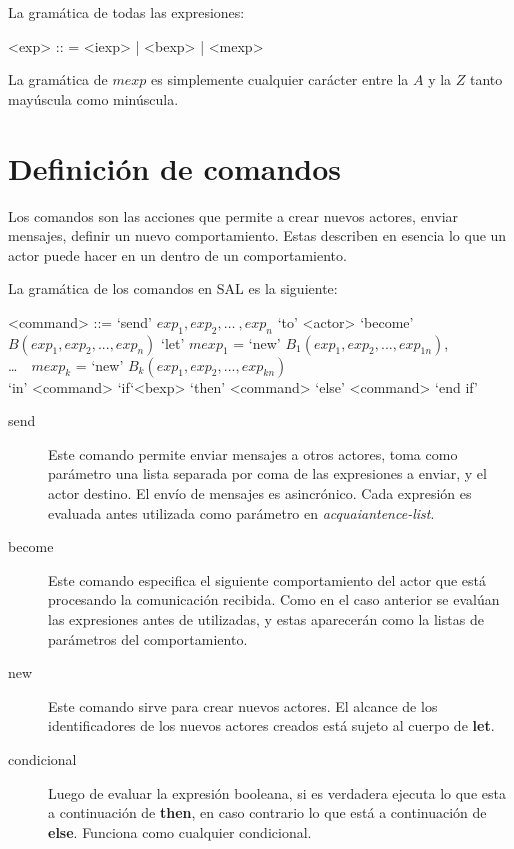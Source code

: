 La gramática de todas las expresiones:

\begin{grammar}
<exp> :: = <iexp> | <bexp> | <mexp> 
\end{grammar}

La gramática de $mexp$ es simplemente cualquier carácter entre la $A$ y la $Z$ tanto mayúscula como minúscula. 

\section{Definición de comandos}

Los comandos son las acciones que permite a \SAL crear nuevos actores, enviar mensajes, definir un nuevo comportamiento. Estas describen en esencia lo que un actor puede hacer en un dentro de un comportamiento.

La gramática de los comandos en SAL es la siguiente:

\begin{grammar}
  <command> ::= `send' $exp_1, exp_2, \ldots\ , exp_n$ `to' <actor>  
  \alt `become' $B(exp_1, exp_2, ..., exp_n)$
  \alt `let' $mexp_1$ = `new' $B_1(exp_1, exp_2, ..., exp_{1n})$, \\
   \ldots\ \ $mexp_k$ = `new' $B_k(exp_1, exp_2, ..., exp_{kn})$   \\
  `in' <command> 
  \alt `if`<bexp> `then' <command> `else' <command> `end if'
\end{grammar}

\begin{description}
\item [send] Este comando permite enviar mensajes a otros actores, toma como parámetro una lista separada por coma de las expresiones a enviar, y el actor destino. El envío de mensajes es asincrónico. Cada expresión es evaluada antes utilizada como parámetro en \textit{acquaiantence-list}.
\item [become] Este comando especifica el siguiente comportamiento del actor que está procesando la comunicación recibida. Como en el caso anterior se evalúan las expresiones antes de utilizadas, y estas aparecerán como la listas de parámetros del comportamiento. 
\item[new] Este comando sirve para crear nuevos actores. El alcance de los
  identificadores de los nuevos actores creados está sujeto al cuerpo de \textbf{let}.
\item[condicional] Luego de evaluar la expresión booleana, si es verdadera
  ejecuta lo que esta a continuación de \textbf{then}, en caso contrario lo que está a
  continuación de \textbf{else}. Funciona como cualquier condicional.
\end{description}

